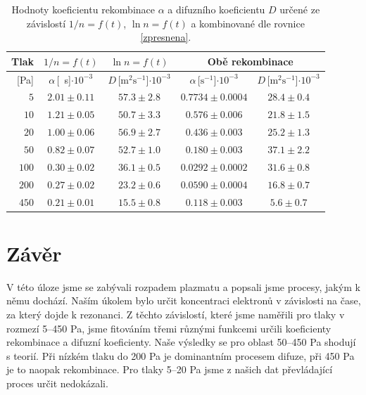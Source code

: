 \documentclass[a4paper,12pt]{article}
\begin{document}
\begin{table}[h]
	\centering
	\caption{Hodnoty koeficientu rekombinace $\alpha$ a difuzního koeficientu 
	$D$ určené ze závislostí $1/n = f(t)$, $\ln n = f(t)$ a kombinované dle 
	rovnice \eqref{zpresnena}.}
	\label{table:koef}
	\begin{tabular}{|r|c|c|c|c|}
		\hline
		Tlak    & $1/n = f(t)$      & $\ln n = f(t)$ & 
		\multicolumn{2}{c|}{Obě rekombinace}                                \\ 
		\hline
		{[}Pa{]} & 
		$\alpha$\,[\si{\per\second}]$\cdot10^{-3}$ & 
		$D$\,[$\si{\metre^2\second^{-1}}$]$\cdot10^{-3}$              & 
		$\alpha$\,[$\si{\second^{-1}}$]$\cdot10^{-3}$ & 
		$D$\,[$\si{\metre^2\second^{-1}}$]$\cdot10^{-3}$ \\ 
		\hline
		$5$                              &$ 2.01                 \pm 
		0.11                $&$ 57.3              \pm  2.8              $& 
		$0.7734    
		\pm 0.0004    $&$ 28.4       \pm  0.4       $\\ \hline
		$10$                             & $1.21                 \pm  
		0.05                $&$ 50.7              \pm  3.3              $&$ 
		0.576     
		\pm 0.006     $&$ 21.8       \pm  1.5       $\\ \hline
		$20                             $&$ 1.00                 \pm  
		0.06                $&$ 56.9              \pm  2.7              $&$ 
		0.436     
		\pm 0.003     $&$ 25.2       \pm  1.3       $\\ \hline
		$50                             $&$ 0.82                 \pm  
		0.07                $&$ 52.7              \pm  1.0              $&$ 
		0.180     
		\pm 0.003     $&$ 37.1       \pm  2.2       $\\ \hline
		$100                            $&$ 0.30                 \pm  
		0.02                $&$ 36.1              \pm  0.5              $& 
		$0.0292    
		\pm 0.0002    $&$ 31.6       \pm  0.8       $\\ \hline
		$200                            $&$ 0.27                 \pm  
		0.02                $&$ 23.2              \pm  0.6              $& 
		$0.0590    
		\pm 0.0004    $&$ 16.8       \pm  0.7       $\\ \hline
		$450                            $&$ 0.21                 \pm  
		0.01                $&$ 15.5              \pm  0.8              $& 
		$0.118     
		\pm 0.003     $&$ 5.6        \pm  0.7       $\\ \hline
	\end{tabular}
\end{table}
\clearpage
\section{Závěr}
V této úloze jsme se zabývali rozpadem plazmatu a popsali jsme procesy, jakým k němu dochází. Naším úkolem bylo určit koncentraci elektronů v závislosti na čase, za který dojde k rezonanci. Z těchto závislostí, které jsme naměřili pro tlaky v rozmezí 5--450 Pa, jsme fitováním třemi různými funkcemi určili koeficienty rekombinace a difuzní koeficienty. Naše výsledky se pro oblast 50--450 Pa shodují s teorií. Při nízkém tlaku do 200 Pa je dominantním procesem difuze, při 450 Pa je to naopak rekombinace. Pro tlaky 5--20 Pa jsme z našich dat převládající proces určit nedokázali.
\end{document}
